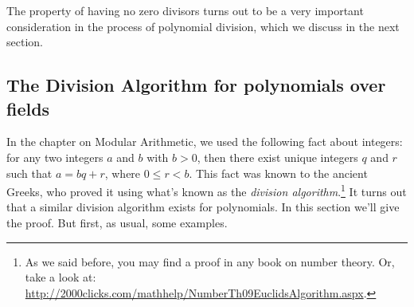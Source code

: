 The property of having no zero divisors turns out to be a very important consideration in the process of polynomial division, which we discuss in the next section.

\subsection{The Division Algorithm for polynomials over fields\quad
{}}\label{divisionalgorithm}
In the chapter on Modular Arithmetic, we used the following fact about integers: for any two integers $a$ and $b$  with $b > 0$, then there exist unique
integers $q$ and $r$ such that $a = bq+r$, where $0 \leq r < b$. This fact was known to the ancient Greeks, who proved it using what's known as the \emph{division algorithm}.\footnote{As we said before, you may find a proof in any book on number theory. Or, take a look at:  \url{http://2000clicks.com/mathhelp/NumberTh09EuclidsAlgorithm.aspx}.} It turns out that a similar
division algorithm exists for
polynomials. In this section we'll  give the proof. But first, as usual, some examples.

